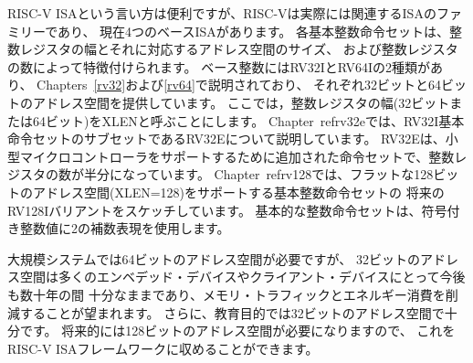 RISC-V ISAという言い方は便利ですが、RISC-Vは実際には関連するISAのファミリーであり、
現在4つのベースISAがあります。 
各基本整数命令セットは、整数レジスタの幅とそれに対応するアドレス空間のサイズ、
および整数レジスタの数によって特徴付けられます。 
ベース整数にはRV32IとRV64Iの2種類があり、
Chapters~\ref{rv32}および\ref{rv64}で説明されており、
それぞれ32ビットと64ビットのアドレス空間を提供しています。
ここでは，整数レジスタの幅(32ビットまたは64ビット)をXLENと呼ぶことにします。
Chapter~ref{rv32e}では、RV32I基本命令セットのサブセットであるRV32Eについて説明しています。
RV32Eは、小型マイクロコントローラをサポートするために追加された命令セットで、整数レジスタの数が半分になっています。
Chapter~ref{rv128}では、フラットな128ビットのアドレス空間(XLEN=128)をサポートする基本整数命令セットの
将来のRV128Iバリアントをスケッチしています。
基本的な整数命令セットは、符号付き整数値に2の補数表現を使用します。

\begin{commentary}
大規模システムでは64ビットのアドレス空間が必要ですが、
32ビットのアドレス空間は多くのエンベデッド・デバイスやクライアント・デバイスにとって今後も数十年の間
十分なままであり、メモリ・トラフィックとエネルギー消費を削減することが望まれます。
さらに、教育目的では32ビットのアドレス空間で十分です。
将来的には128ビットのアドレス空間が必要になりますので、
これをRISC-V ISAフレームワークに収めることができます。
\end{commentary}

